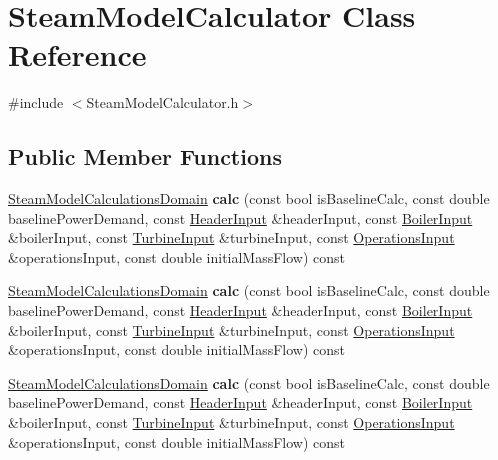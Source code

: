 \hypertarget{class_steam_model_calculator}{}\section{Steam\+Model\+Calculator Class Reference}
\label{class_steam_model_calculator}


{\ttfamily \#include $<$Steam\+Model\+Calculator.\+h$>$}

\subsection*{Public Member Functions}
\begin{DoxyCompactItemize}
\item 
\mbox{\label{class_steam_model_calculator_a9da4fe2b4f7f7849f73e40f3b7d9e761}} 
\hyperlink{class_steam_model_calculations_domain}{Steam\+Model\+Calculations\+Domain} {\bfseries calc} (const bool is\+Baseline\+Calc, const double baseline\+Power\+Demand, const \hyperlink{class_header_input}{Header\+Input} \&header\+Input, const \hyperlink{class_boiler_input}{Boiler\+Input} \&boiler\+Input, const \hyperlink{class_turbine_input}{Turbine\+Input} \&turbine\+Input, const \hyperlink{class_operations_input}{Operations\+Input} \&operations\+Input, const double initial\+Mass\+Flow) const
\item 
\mbox{\label{class_steam_model_calculator_a9da4fe2b4f7f7849f73e40f3b7d9e761}} 
\hyperlink{class_steam_model_calculations_domain}{Steam\+Model\+Calculations\+Domain} {\bfseries calc} (const bool is\+Baseline\+Calc, const double baseline\+Power\+Demand, const \hyperlink{class_header_input}{Header\+Input} \&header\+Input, const \hyperlink{class_boiler_input}{Boiler\+Input} \&boiler\+Input, const \hyperlink{class_turbine_input}{Turbine\+Input} \&turbine\+Input, const \hyperlink{class_operations_input}{Operations\+Input} \&operations\+Input, const double initial\+Mass\+Flow) const
\item 
\mbox{\label{class_steam_model_calculator_a9da4fe2b4f7f7849f73e40f3b7d9e761}} 
\hyperlink{class_steam_model_calculations_domain}{Steam\+Model\+Calculations\+Domain} {\bfseries calc} (const bool is\+Baseline\+Calc, const double baseline\+Power\+Demand, const \hyperlink{class_header_input}{Header\+Input} \&header\+Input, const \hyperlink{class_boiler_input}{Boiler\+Input} \&boiler\+Input, const \hyperlink{class_turbine_input}{Turbine\+Input} \&turbine\+Input, const \hyperlink{class_operations_input}{Operations\+Input} \&operations\+Input, const double initial\+Mass\+Flow) const
\end{DoxyCompactItemize}


